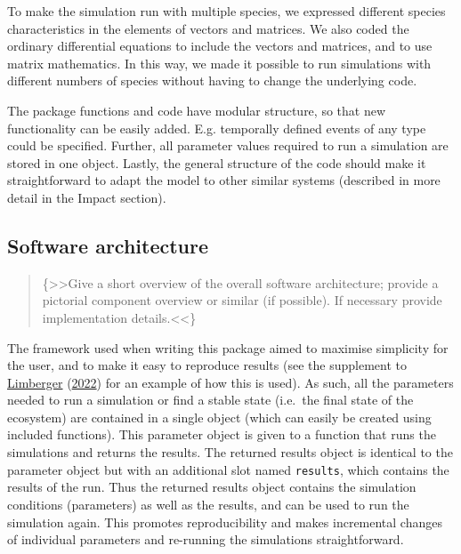 \documentclass[]{elsarticle} %
\begin{document}
To make the simulation run with multiple species, we expressed different
species characteristics in the elements of vectors and matrices. We also
coded the ordinary differential equations to include the vectors and
matrices, and to use matrix mathematics. In this way, we made it
possible to run simulations with different numbers of species without
having to change the underlying code.

The package functions and code have modular structure, so that new
functionality can be easily added. E.g. temporally defined events of any
type could be specified. Further, all parameter values required to run a
simulation are stored in one object. Lastly, the general structure of
the code should make it straightforward to adapt the model to other
similar systems (described in more detail in the Impact section).

\hypertarget{software-architecture}{%
\subsection{Software architecture}\label{software-architecture}}

\begin{quote}
\{\textgreater\textgreater Give a short overview of the overall software
architecture; provide a pictorial component overview or similar (if
possible). If necessary provide implementation
details.\textless\textless\}
\end{quote}

The framework used when writing this package aimed to maximise
simplicity for the user, and to make it easy to reproduce results (see
the supplement to \protect\hyperlink{ref-Limberger2022}{Limberger}
(\protect\hyperlink{ref-Limberger2022}{2022}) for an example of how this
is used). As such, all the parameters needed to run a simulation or find
a stable state (i.e.~the final state of the ecosystem) are contained in
a single object (which can easily be created using included functions).
This parameter object is given to a function that runs the simulations
and returns the results. The returned results object is identical to the
parameter object but with an additional slot named \texttt{results},
which contains the results of the run. Thus the returned results object
contains the simulation conditions (parameters) as well as the results,
and can be used to run the simulation again. This promotes
reproducibility and makes incremental changes of individual parameters
and re-running the simulations straightforward.
\end{document}
